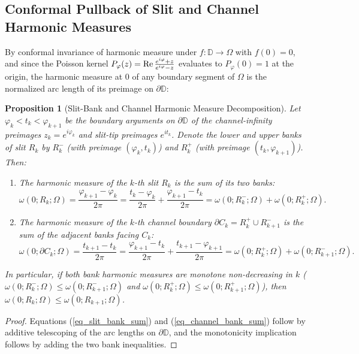 \documentclass[11pt,reqno]{amsart}
\newtheorem{prop}[thm]{Proposition}
\numberwithin{equation}{section}
\renewcommand{\phi}{\varphi}
\newcommand{\D}{\mathbb{D}}
\newcommand{\re}{\mbox{\rm Re\,}}
\begin{document}
\subsection{Conformal Pullback of Slit and Channel Harmonic Measures}

By conformal invariance of harmonic measure under $f : \D \to \varOmega$ with $f(0) = 0$, and since the Poisson kernel $P_\phi(z) = \re\frac{e^{i\phi}+z}{e^{i\phi}-z}$ evaluates to $P_\phi(0) = 1$ at the origin, the harmonic measure at $0$ of any boundary segment of $\varOmega$ is the normalized arc length of its preimage on $\partial\D$:

\begin{prop}[Slit-Bank and Channel Harmonic Measure Decomposition] \label{prop_bank_channel_decomp}
Let $\phi_k < t_k < \phi_{k+1}$ be the boundary arguments on $\partial\D$ of the channel-infinity preimages $z_k = e^{i\phi_k}$ and slit-tip preimages $e^{it_k}$. Denote the lower and upper banks of slit $R_k$ by $R_k^-$ (with preimage $(\phi_k, t_k)$) and $R_k^+$ (with preimage $(t_k, \phi_{k+1})$). Then:
\begin{enumerate}
\item The harmonic measure of the $k$-th slit $R_k$ is the sum of its two banks:
\begin{equation} \label{eq_slit_bank_sum}
  \omega(0; R_k; \varOmega) = \frac{\phi_{k+1} - \phi_k}{2\pi} = \frac{t_k - \phi_k}{2\pi} + \frac{\phi_{k+1} - t_k}{2\pi} = \omega(0; R_k^-; \varOmega) + \omega(0; R_k^+; \varOmega).
\end{equation}
\item The harmonic measure of the $k$-th channel boundary $\partial C_k = R_k^+ \cup R_{k+1}^-$ is the sum of the adjacent banks facing $C_k$:
\begin{equation} \label{eq_channel_bank_sum}
  \omega(0; \partial C_k; \varOmega) = \frac{t_{k+1} - t_k}{2\pi} = \frac{\phi_{k+1} - t_k}{2\pi} + \frac{t_{k+1} - \phi_{k+1}}{2\pi} = \omega(0; R_k^+; \varOmega) + \omega(0; R_{k+1}^-; \varOmega).
\end{equation}
\end{enumerate}
In particular, if both bank harmonic measures are monotone non-decreasing in $k$ ($\omega(0; R_k^-; \varOmega) \le \omega(0; R_{k+1}^-; \varOmega)$ and $\omega(0; R_k^+; \varOmega) \le \omega(0; R_{k+1}^+; \varOmega)$), then $\omega(0; R_k; \varOmega) \le \omega(0; R_{k+1}; \varOmega)$.
\end{prop}
\begin{proof}
Equations (\ref{eq_slit_bank_sum}) and (\ref{eq_channel_bank_sum}) follow by additive telescoping of the arc lengths on $\partial\D$, and the monotonicity implication follows by adding the two bank inequalities.
\end{proof}
\end{document}

